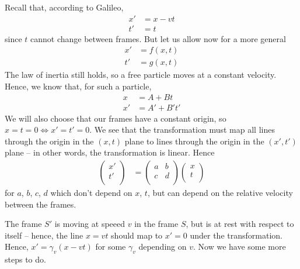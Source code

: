 \documentclass{../template/note}
\begin{document}
    Recall that, according to Galileo,
    \begin{align*}
        x' &= x-vt \\
        t' &= t
    \end{align*}
    since \(t\) cannot change between frames. But let us allow now for a more general
    \begin{align*}
        x' &= f(x, t) \\
        t' &= g(x, t)
    \end{align*}
    The law of inertia still holds, so a free particle moves at a constant velocity. Hence, we know that, for such a particle,  
    \begin{align*}
        x &= A + Bt \\
        x' &= A' + B't'
    \end{align*}
    We will also choose that our frames have a constant origin, so \(x = t = 0 \iff x' = t' = 0\). We see that the transformation must map all lines through the origin in the \((x, t)\) plane to lines through the origin in the \((x', t')\) plane -- in other words, the transformation is linear. Hence
    \begin{align*}
        \begin{pmatrix}
         x' \\
         t' \\
        \end{pmatrix} &= \begin{pmatrix}
         a & b \\
         c & d \\
        \end{pmatrix} \begin{pmatrix}
         x \\
         t \\
        \end{pmatrix}
    \end{align*}
    for \(a\), \(b\), \(c\), \(d\) which don't depend on \(x\), \(t\), but can depend on the relative velocity between the frames.
    
    
    The frame \(S'\) is moving at speeed \(v\) in the frame \(S\), but is at rest with respect to itself -- hence, the line \(x=vt\) should map to \(x'=0\) under the transformation. Hence, \(x' = \gamma_v(x-vt)\) for some \(\gamma_v\) depending on \(v\). Now we have some more steps to do.
\end{document}
